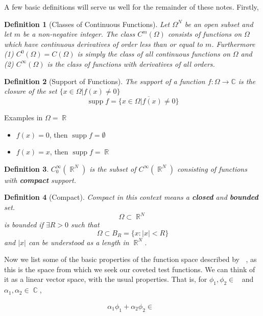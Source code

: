 \documentclass[12pt, a4]{article}
\newtheorem{definition}{Definition}[section]
\DeclareMathOperator\supp{supp}
\DeclareMathOperator\reals{\mathbb{R}}
\DeclareMathOperator\complexes{\mathbb{C}}
\DeclareMathOperator\tfspace{C_0^\infty}
\begin{document}
A few basic definitions will serve us well for the remainder of these notes. Firstly,

\begin{definition}[Classes of Continuous Functions]
Let $\Omega^N$ be an open subset and let $m$ be a non-negative integer. The class $C^m(\Omega)$ consists of functions on $\Omega$ which have continuous derivatives of order less than or equal to $m$. Furthermore (1) $C^0(\Omega) = C(\Omega)$  is simply the class of all continuous functions on $\Omega$ and (2) $C^\infty (\Omega)$ is the class of functions with derivatives of all orders.
\label{def:c_m_functions}
\end{definition}

\begin{definition}[Support of Functions]
The support of a function $f : \Omega \rightarrow \mathbb{C}$ is the closure of the set $\{x \in \Omega | f(x) \neq 0\}$
\[ \supp f = \overline{\{x \in \Omega | f(x) \neq 0\}}\]
\label{def:support_of_functions}
\end{definition}

Examples in $\Omega = \reals$

\begin{itemize}
    \item $f(x) = 0$, then  $\supp f = \emptyset$
    \item $f(x) = x$, then $\supp f = \reals$
\end{itemize}

\begin{definition}
    $C_0^\infty(\reals^N)$ is the subset of $C^\infty(\reals^N)$ consisting of functions with \textbf{compact} support.
\end{definition}

\begin{definition}[Compact]
    Compact in this context means a \textbf{closed} and \textbf{bounded} set.
    \[ \Omega \subset \reals^N\]
    is bounded if $\exists R > 0$ such that
    \[\Omega \subset B_R = \{ x : |x| < R\}\]
    and $|x|$ can be understood as a length in $\reals^N$.
\end{definition}

Now we list some of the basic properties of the function space described by $\tfspace$, as this is the space from which we seek our coveted test functions. We can think of it as a linear vector space, with the usual properties. That is, for $\phi_1, \phi_2 \in \tfspace$ and $\alpha_1, \alpha_2 \in \complexes$,

\begin{eqnarray}
    \alpha_1\phi_1 + \alpha_2\phi_2  \in \tfspace
\end{eqnarray}
\end{document}
